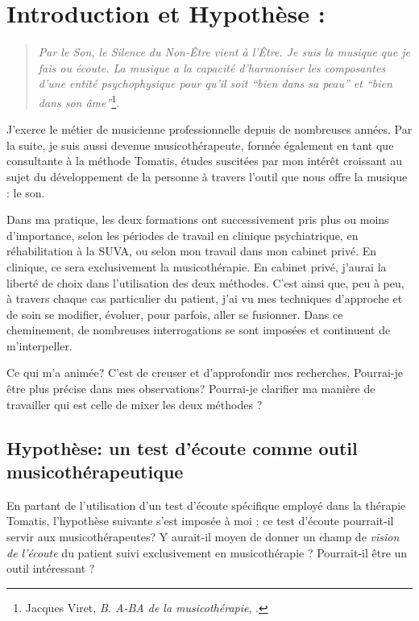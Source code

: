 \chapter{Introduction et Hypothèse : }
\begin{quotation}
\emph{Par le Son, le Silence du Non-Être vient à l'Être. Je suis
la musique que je fais ou écoute. La musique a la capacité d'harmoniser
les composantes d'une entité psychophysique pour qu'il soit ``bien
dans sa peau'' et ``bien dans son âme''}\footnote{Jacques Viret, \emph{B. A-BA de la musicothérapie}, \cite{Viret2007}.}.
\end{quotation}
J'exerce le métier de musicienne professionnelle depuis de nombreuses
années. Par la suite, je suis aussi devenue musicothérapeute, formée
également en tant que consultante à la méthode Tomatis, études suscitées
par mon intérêt croissant au sujet du développement de la personne
à travers l'outil que nous offre la musique : le son.

Dans ma pratique, les deux formations ont successivement pris plus
ou moins d'importance, selon les périodes de travail en clinique psychiatrique,
en réhabilitation à la SUVA, ou selon mon travail dans mon cabinet
privé. En clinique, ce sera exclusivement la musicothérapie. En cabinet
privé, j'aurai la liberté de choix dans l'utilisation des deux méthodes.
C'est ainsi que, peu à peu, à travers chaque cas particulier du patient,
j'ai vu mes techniques d'approche et de soin se modifier, évoluer,
pour parfois, aller se fusionner. Dans ce cheminement, de nombreuses
interrogations se sont imposées et continuent de m'interpeller.

Ce qui m'a animée? C'est de creuser et d'approfondir mes recherches.
Pourrai-je être plus précise dans mes observations? Pourrai-je
clarifier ma manière de travailler qui est celle de mixer les deux
méthodes ?

\section{Hypothèse: un test d'écoute comme outil musicothérapeutique}


En partant de l'utilisation d'un test d'écoute spécifique employé dans
la thérapie Tomatis, l'hypothèse suivante s'est imposée à moi : ce
test d'écoute pourrait-il servir aux musicothérapeutes? Y aurait-il
moyen de donner un champ de \emph{vision de l'écoute} du patient suivi
exclusivement en musicothérapie ? Pourrait-il être un outil
intéressant ?


